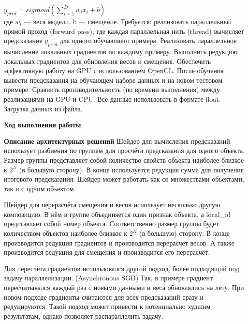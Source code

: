 \documentclass[a4paper,14pt]{extarticle}
\begin{document}
$y_{pred} = sigmoid(\sum_{i=1}^{D}w_ix_i + b)$\\

где $w_i$ — веса модели, b — смещение. Требуется: реализовать параллельный прямой проход
(forward pass), где каждая параллельная нить (thread) вычисляет предсказание $y_{pred}$ для
одного обучающего примера. Реализовать параллельное вычисление локальных градиентов
по каждому примеру. Выполнить редукцию локальных градиентов для обновления весов и
смещения. Обеспечить эффективную работу на GPU с использованием OpenCL. После
обучения вывести предсказания на обучающем наборе данных и на новом тестовом примере.
Сравнить производительность (по времени выполнения) между реализациями на GPU и CPU.
Все данные использовать в формате float. Загрузка данных из файла.
\begin{center}
\textbf{Ход выполнения работы}
\end{center}

\textbf{Описание архитектурных решений}
Шейдер для вычисления предсказаний использует разбиения по группам для просчёта
предсказания для одного объекта. Размер группы представляет собой количество свойств объекта
наиболее близкое к $2^N$ (в большую сторону). В конце используется редукция сумма для 
получения итогового предсказания. Шейдер может работать как со множествами объектами, 
так и с одним объектом.

Шейдер для перерасчёта смещения и весов использует несколько другую композицию. В нём
в группе объединяется один признак объекта, а local\_id представляет собой номер объекта.
Соответственно размер группы будет количеством объектов наиболее близкое к $2^N$ (в большую)
сторону. В конце производится редукция градиентов и производится перерасчёт весов. А также
производится редукция для смещения и производится его перерасчёт.

Для пересчёта градиентов использовался другой подход, более подходящий под задачу параллелизации. (Asynchronous SGD)
Так, в примере градиент пересчитывался каждый раз с новыми данными и веса обновлялись на лету. 
При новом подходе градиенты считаются для всех предсказаний сразу и редуцируются. Такой подход может 
привести к потенциально худшим результатам, однако позволяет распараллелить задачу.
\end{document}
